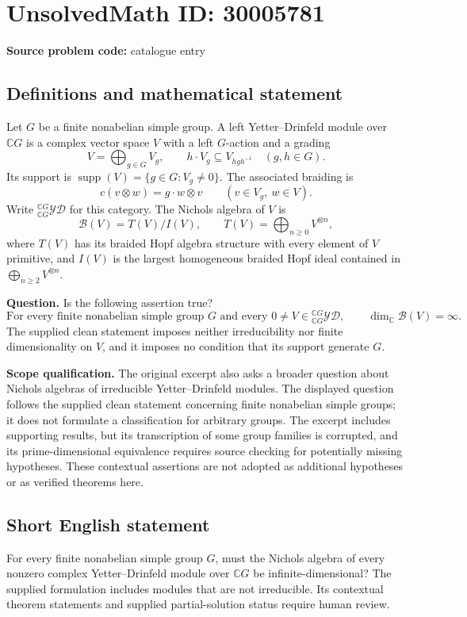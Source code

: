\documentclass[11pt]{article}
\newcommand{\C}{\mathbb{C}}
\begin{document}
\section*{UnsolvedMath ID: 30005781}
\textbf{Source problem code:} catalogue entry
\subsection{Definitions and mathematical statement}
Let \(G\) be a finite nonabelian simple group. A left Yetter--Drinfeld module over \(\C G\) is a complex vector space \(V\) with a left \(G\)-action and a grading
\[
V=\bigoplus_{g\in G}V_g,
\qquad h\cdot V_g\subseteq V_{hgh^{-1}}\quad(g,h\in G).
\]
Its support is \(\operatorname{supp}(V)=\{g\in G:V_g\ne0\}\). The associated braiding is
\[
c(v\otimes w)=g\cdot w\otimes v
\qquad(v\in V_g,\ w\in V).
\]
Write \({}_{\C G}^{\C G}\mathcal{YD}\) for this category. The Nichols algebra of \(V\) is
\[
\mathcal B(V)=T(V)/I(V),\qquad T(V)=\bigoplus_{n\ge0}V^{\otimes n},
\]
where \(T(V)\) has its braided Hopf algebra structure with every element of \(V\) primitive, and \(I(V)\) is the largest homogeneous braided Hopf ideal contained in \(\bigoplus_{n\ge2}V^{\otimes n}\).

\textbf{Question.} Is the following assertion true?
\[
\text{For every finite nonabelian simple group }G
\text{ and every }0\ne V\in{}_{\C G}^{\C G}\mathcal{YD},
\qquad \dim_{\C}\mathcal B(V)=\infty.
\]
The supplied clean statement imposes neither irreducibility nor finite dimensionality on \(V\), and it imposes no condition that its support generate \(G\).

\textbf{Scope qualification.} The original excerpt also asks a broader question about Nichols algebras of irreducible Yetter--Drinfeld modules. The displayed question follows the supplied clean statement concerning finite nonabelian simple groups; it does not formulate a classification for arbitrary groups. The excerpt includes supporting results, but its transcription of some group families is corrupted, and its prime-dimensional equivalence requires source checking for potentially missing hypotheses. These contextual assertions are not adopted as additional hypotheses or as verified theorems here.
\subsection{Short English statement}
For every finite nonabelian simple group \(G\), must the Nichols algebra of every nonzero complex Yetter--Drinfeld module over \(\C G\) be infinite-dimensional? The supplied formulation includes modules that are not irreducible. Its contextual theorem statements and supplied partial-solution status require human review.
\end{document}
